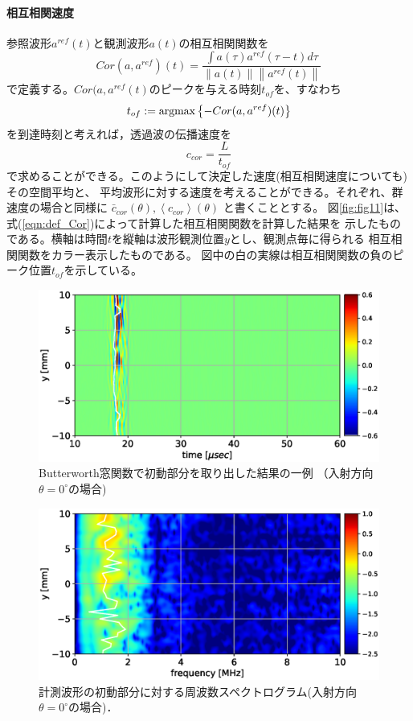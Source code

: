 \paragraph{相互相関速度}
参照波形$a^{ref}(t)$と観測波形$a(t)$の相互相関関数を
\begin{equation}
	Cor(a,a^{ref})(t)=
	\frac{
	\int a(\tau)a^{ref}(\tau-t) d\tau
	}{
		\left\| a(t)\right\|
		\left\| a^{ref}(t)\right\|
	}
	\label{eqn:def_Cor}
\end{equation}
で定義する。$Cor(a,a^{ref}(t)$のピークを与える時刻$t_{of}$を、すなわち
\begin{equation}
	t_{of}:={\rm argmax} \left\{
		-Cor(a,a^{ref})(t)
		\right\}
	\label{eqn:def_tof}
\end{equation}
を到達時刻と考えれば，透過波の伝播速度を
\begin{equation}
	c_{cor}=\frac{L}{t_{of}}
	\label{eqn:}
\end{equation}
で求めることができる。このようにして決定した速度(相互相関速度についても)その空間平均と、
平均波形に対する速度を考えることができる。それぞれ、群速度の場合と同様に
$\bar c_{cor}(\theta), \left< c_{cor}\right>(\theta)$
と書くこととする。
図\ref{fig:fig11}は、式(\ref{eqn:def_Cor})によって計算した相互相関関数を計算した結果を
示したものである。横軸は時間$t$を縦軸は波形観測位置$y$とし、観測点毎に得られる
相互相関関数をカラー表示したものである。
図中の白の実線は相互相関関数の負のピーク位置$t_{of}$を示している。
\begin{figure}[h]
	\begin{center}
	\includegraphics[width=0.7\linewidth]{Figs/fig6.eps} 
	\end{center}
	\caption{
		Butterworth窓関数で初動部分を取り出した結果の一例
		（入射方向$\theta=0^{\circ}$の場合)
	} 
	\label{fig:fig6}
\end{figure}
\begin{figure}[h]
	\begin{center}
	\includegraphics[width=0.7\linewidth]{Figs/fig7.eps} 
	\end{center}
	\caption{
		計測波形の初動部分に対する周波数スペクトログラム(入射方向$\theta=0^{\circ}$の場合)．
	} 
	\label{fig:fig7}
\end{figure}
